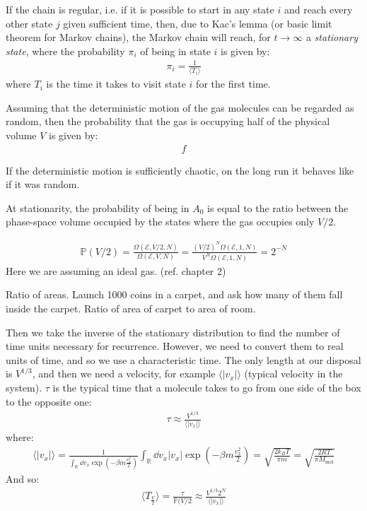 \documentclass[../template.tex]{subfiles}
\begin{document}
If the chain is regular, i.e. if it is possible to start in any state $i$ and reach every other state $j$ given sufficient time, then, due to Kac's lemma (or basic limit theorem for Markov chains), the Markov chain will reach, for $t \to \infty$ a \textit{stationary state}, where the probability $\pi_i$ of being in state $i$ is given by:
\begin{align*}
    \pi_i = \frac{1}{\langle T_i \rangle} 
\end{align*}
where $T_i$ is the time it takes to visit state $i$ for the first time. 

\medskip

Assuming that the deterministic motion of the gas molecules can be regarded as random, then the probability that the gas is occupying half of the physical volume $V$ is given by:
\begin{align*}
    f
\end{align*}


If the deterministic motion is sufficiently chaotic, on the long run it behaves like if it was random. 

At stationarity, the probability of being in $A_0$ is equal to the ratio between the phase-space volume occupied by the states where the gas occupies only $V/2$. 

\begin{align*}
    \mathbb{P}(V/2) = \frac{\Omega(\mathcal{E}, V/2, N)}{\Omega(\mathcal{E}, V, N)} = \frac{(V/2)^N \Omega(\mathcal{E},1, N)}{V^N \Omega (\mathcal{E},1,N)} = 2^{-N}
\end{align*}
Here we are assuming an ideal gas. (ref. chapter 2)

Ratio of areas. Launch 1000 coins in a carpet, and ask how many of them fall inside the carpet. Ratio of area of carpet to area of room. 

Then we take the inverse of the stationary distribution to find the number of time units necessary for recurrence. However, we need to convert them to real units of time, and so we use a characteristic time. The only length at our disposal is $V^{1/3}$, and then we need a velocity, for example $\langle |v_x| \rangle$ (typical velocity in the system). 
$\tau$ is the typical time that a molecule takes to go from one side of the box to the opposite one:
\begin{align*}
    \tau \approx \frac{V^{1/3}}{\langle |v_x| \rangle} 
\end{align*}
where:
\begin{align*}
    \langle |v_x| \rangle = \frac{1}{{\int_{\mathbb{R}} \dd{v_x} \exp\left(-\beta m \frac{v_x^2}{2} \right)}}  \int_{\mathbb{R}} \dd{v_x} |v_x| {\exp(-\beta m \frac{v_x^2}{2} )} = \sqrt{\frac{2 k_B T}{\pi m}} = \sqrt{\frac{2 R T}{\pi M_{\mathrm{mol}}} }
\end{align*}
And so:
\begin{align*}
    \langle T_{\frac{V}{2}} \rangle = \frac{\tau}{\mathbb{P}(V/2} \approx \frac{V^{1/3} 2^N}{\langle |v_x| \rangle} 
\end{align*}%
\end{document}
